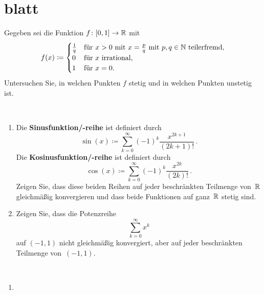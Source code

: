 \section{blatt}

\begin{aufg}[6 Punkte]
Gegeben sei die Funktion $f\colon [0,1]\to\mathbb{R}$ mit 
\[
 f(x) \coloneqq 
 \begin{cases}
  \frac1q & \text{f\"ur~$x>0$ mit $x=\frac{p}{q}$ mit $p,q\in\mathbb{N}$ 
teilerfremd},
  \\
  0 & \text{f\"ur $x$ irrational},
  \\
  1 & \text{f\"ur $x=0$}.
 \end{cases}
\]
Untersuchen Sie, in welchen Punkten $f$ stetig und in welchen Punkten unstetig 
ist.
\end{aufg}

\bigskip


\begin{lsg}
\end{lsg}


\bigskip


\begin{aufg}[6 Punkte] \mbox{ }
\begin{enumerate}[label=$\mathrm{(\roman*)}$, ref=$\mathrm{\roman*}$]
\item Die \textbf{Sinusfunktion/-reihe} ist definiert durch 
\[
 \sin(x) \coloneqq \sum_{k=0}^\infty (-1)^k \frac{x^{2k+1}}{(2k+1)!}\,.
\]
Die \textbf{Kosinusfunktion/-reihe} ist definiert durch 
\[
 \cos(x) \coloneqq \sum_{k=0}^\infty (-1)^k \frac{x^{2k}}{(2k)!}\,.
\]
Zeigen Sie, dass diese beiden Reihen auf jeder beschr\"ankten Teilmenge 
von~$\mathbb{R}$ gleichm\"a{\ss}ig konvergieren und dass beide Funktionen auf ganz~$\mathbb{R}$ 
stetig sind.
%
\item Zeigen Sie, dass die Potenzreihe
\[
 \sum_{k=0}^\infty x^k
\]
auf $(-1,1)$ nicht gleichm\"a{\ss}ig konvergiert, aber auf jeder beschr\"ankten 
Teilmenge von~$(-1,1)$.
\end{enumerate}
\end{aufg}

\bigskip


\begin{lsg}\mbox{ }
\begin{enumerate}[label=$\mathrm{(\roman*)}$, ref=$\mathrm{\roman*}$]
\item 
\end{enumerate}
\end{lsg}


\bigskip


